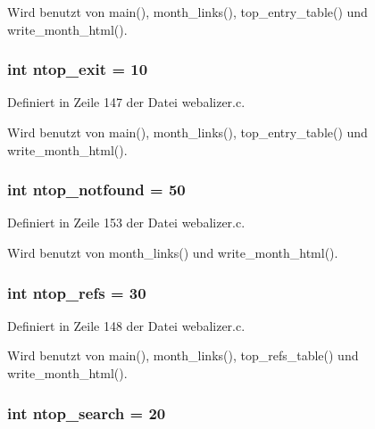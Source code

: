 Wird benutzt von main(), month\_\-links(), top\_\-entry\_\-table() und write\_\-month\_\-html().
\subsubsection{\setlength{\rightskip}{0pt plus 5cm}int {\bf ntop\_\-exit} = 10}\label{webalizer_8c_9d1968145275f8eb19935b5c6d5b2848}




Definiert in Zeile 147 der Datei webalizer.c.

Wird benutzt von main(), month\_\-links(), top\_\-entry\_\-table() und write\_\-month\_\-html().
\subsubsection{\setlength{\rightskip}{0pt plus 5cm}int {\bf ntop\_\-notfound} = 50}\label{webalizer_8c_aae85fa49329c9361a901e52954764eb}




Definiert in Zeile 153 der Datei webalizer.c.

Wird benutzt von month\_\-links() und write\_\-month\_\-html().
\subsubsection{\setlength{\rightskip}{0pt plus 5cm}int {\bf ntop\_\-refs} = 30}\label{webalizer_8c_78414d5060b40b23c1fbb95546fb74d3}




Definiert in Zeile 148 der Datei webalizer.c.

Wird benutzt von main(), month\_\-links(), top\_\-refs\_\-table() und write\_\-month\_\-html().
\subsubsection{\setlength{\rightskip}{0pt plus 5cm}int {\bf ntop\_\-search} = 20}\label{webalizer_8c_57e3ec40e1f85e8b2620950dc43b753f}





